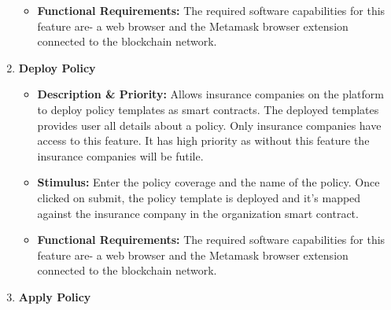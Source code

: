 \begin{enumerate}
\begin{itemize}
	       \item \textbf{Functional Requirements:} The required software capabilities for this feature are- a web browser and the Metamask browser extension connected to the blockchain network.
	   \end{itemize}
	\item \textbf{Deploy Policy}
	   	    \begin{itemize}
	       \item \textbf{Description \& Priority:} Allows insurance companies on the platform to deploy policy templates as smart contracts. The deployed templates provides user all details about a policy. Only insurance companies have access to this feature. It has high priority as without this feature the insurance companies will be futile.   
	       \item \textbf{Stimulus:} Enter the policy coverage and the name of the policy. Once clicked on submit, the policy template is deployed and it's mapped against the insurance company in the organization smart contract.
	       \item \textbf{Functional Requirements:} The required software capabilities for this feature are- a web browser and the Metamask browser extension connected to the blockchain network.
	   \end{itemize}   	      
	\item \textbf{Apply Policy}

\end{enumerate}

